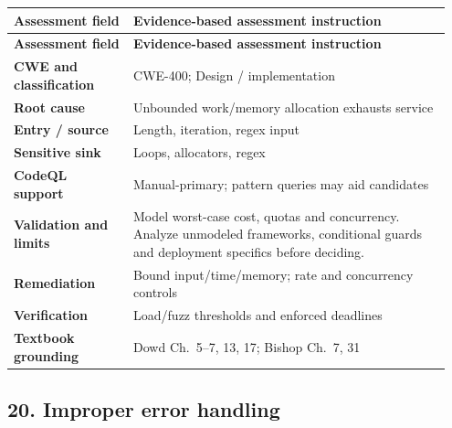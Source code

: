 \documentclass[11pt,letterpaper,oneside]{book}
\begin{document}
\small
\setlength{\tabcolsep}{2pt}
\renewcommand{\arraystretch}{1.18}
\begin{longtable}{>{\raggedright\arraybackslash}p{0.26\linewidth}>{\raggedright\arraybackslash}p{0.69\linewidth}}
\toprule
\textbf{Assessment field} & \textbf{Evidence-based assessment instruction}\\
\midrule
\endfirsthead
\toprule
\textbf{Assessment field} & \textbf{Evidence-based assessment instruction}\\
\midrule
\endhead
\textbf{CWE and classification} & CWE-400; Design / implementation\\
\textbf{Root cause} & Unbounded work/memory allocation exhausts service\\
\textbf{Entry / source} & Length, iteration, regex input\\
\textbf{Sensitive sink} & Loops, allocators, regex\\
\textbf{CodeQL support} & Manual-primary; pattern queries may aid candidates\\
\textbf{Validation and limits} & Model worst-case cost, quotas and concurrency. Analyze unmodeled frameworks, conditional guards and deployment specifics before deciding.\\
\textbf{Remediation} & Bound input/time/memory; rate and concurrency controls\\
\textbf{Verification} & Load/fuzz thresholds and enforced deadlines\\
\textbf{Textbook grounding} & Dowd Ch.~5--7, 13, 17; Bishop Ch.~7, 31\\
\bottomrule
\end{longtable}
\normalsize

\subsection{20. Improper error handling}
\end{document}
